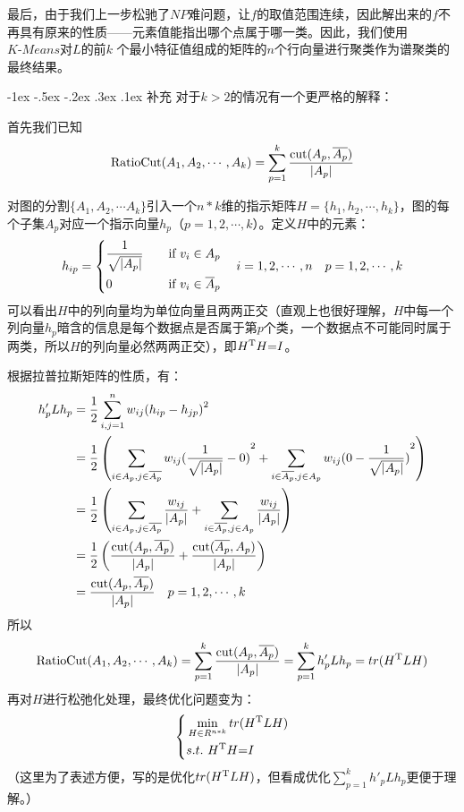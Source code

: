\documentclass[a4paper, 11pt]{article}
\makeatletter
\newcommand{\xiaosihao}{\fontsize{12pt}{\baselineskip}\selectfont}
\renewcommand\subsubsection{\@startsection{subsubsection}{1}{\z@}%
{-1ex \@plus -.5ex \@minus -.2ex}%
{.3ex \@plus .1ex}%
{\normalfont\xiaosihao\CJKfamily{hei}}}
\makeatother
\begin{document}
\begin{CJK*}{GBK}{song}
\quad\quad
最后，由于我们上一步松驰了$NP$难问题，让$f$的取值范围连续，因此解出来的$f$不再具有原来的性质——元素值能指出哪个点属于哪一类。因此，我们使用$K\text{-}Means$对$L$的前$k$ 个最小特征值组成的矩阵的$n$个行向量进行聚类作为谱聚类的最终结果。

\subsubsection{补充}
\quad\quad
对于$k>2$的情况有一个更严格的解释：

\quad\quad
首先我们已知
$${\rm{RatioCut}}({A_1},{A_2}, \cdots ,{A_k}) = \sum\limits_{p = 1}^k {{{{\rm{cut}}({A_p},\overline {{A_p}} )} \over {|{A_p}|}}} $$

\quad\quad
对图的分割$\{ {A_1},{A_2}, \cdots {A_k}\} $引入一个$n*k$维的指示矩阵$H=\{{h_1},{h_2}, \cdots ,{h_k}\}$，图的每个子集$A_p$对应一个指示向量$h_p$（$p=1,2,\cdots,k$）。定义$H$中的元素：
$$h_{ip}=\left\{
\begin{aligned}
&{1 \over {\sqrt {|{A_p}|} }}\quad &\text{if} \ v_i \in A_p\\
&0\quad &\text{if} \ v_i \in \overline A_p\\
\end{aligned}\right.\quad i=1,2,\cdots,n\quad p=1,2,\cdots,k$$
可以看出$H$中的列向量均为单位向量且两两正交（直观上也很好理解，$H$中每一个列向量$h_p$暗含的信息是每个数据点是否属于第$p$个类，一个数据点不可能同时属于两类，所以$H$的列向量必然两两正交），即${H^{\rm{T}}}H{\rm{ = }}I$。

\quad\quad
根据拉普拉斯矩阵的性质，有：
$$\begin{aligned}
{h'_p}L{h_p} &= {1 \over 2}\sum\limits_{i,j = 1}^n {{w_{ij}}{{({h_{ip}} - {h_{jp}})}^2}}\\
&={1 \over 2}\left( {\sum\limits_{i \in {A_p},j \in \overline {{A_p}} } {{w_{ij}}{{({1 \over {\sqrt {|{A_p}|} }} - 0)}^2} + \sum\limits_{i \in \overline {{A_p}} ,j \in {A_p}} {{w_{ij}}{{(0 - {1 \over {\sqrt {|{A_p}|} }})}^2}} } } \right)\\
&={1 \over 2}\left( {\sum\limits_{i \in {A_p},j \in \overline {{A_p}} } {{{{w_{ij}}} \over {|{A_p}|}} + \sum\limits_{i \in \overline {{A_p}} ,j \in {A_p}} {{{{w_{ij}}} \over {|{A_p}|}}} } } \right)\\
&={1 \over 2}\left( {{{{\rm{cut}}({A_p},\overline {{A_p}} )} \over {|{A_p}|}} + {{{\rm{cut}}(\overline {{A_p}} ,{A_p})} \over {|{A_p}|}}} \right)\\
&={{{{\rm{cut}}({A_p},\overline {{A_p}} )} \over {|{A_p}|}}} \quad p=1,2,\cdots,k
\end{aligned}$$
所以
$${\rm{RatioCut}}({A_1},{A_2}, \cdots ,{A_k}) = \sum\limits_{p = 1}^k {{{{\rm{cut}}({A_p},\overline {{A_p}} )} \over {|{A_p}|}}}  = \sum\limits_{p = 1}^k {{h'_p}L{h_p}}  = tr({H^{\rm{T}}}LH)$$
再对$H$进行松弛化处理，最终优化问题变为：
$$\left\{
\begin{aligned}
&\mathop {\min }\limits_{H \in {R^{n*k}}} tr({H^{\rm{T}}}LH)\\
&s.t. \ {H^{\rm{T}}}H{\rm{ = }}I\\
\end{aligned}\right.$$
（这里为了表述方便，写的是优化$tr({H^{\rm{T}}}LH)$，但看成优化$\sum\limits_{p = 1}^k {{h'_p}L{h_p}}$更便于理解。）


\end{CJK*}
\end{document}
